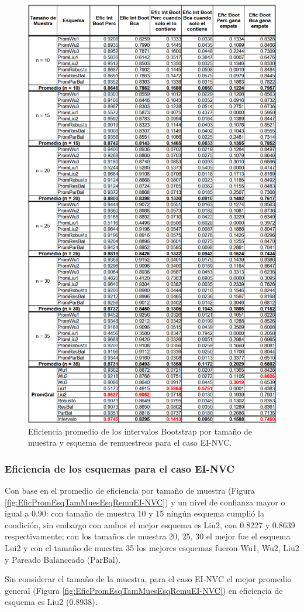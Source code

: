 \begin{figure}[ht] 
	\centering 
	\includegraphics[width=0.55\linewidth]{img/EI_NVC_Efic_Boots.png} 
	\caption{Eficiencia promedio de los intervalos Bootstrap por tamaño de muestra y esquema de remuestreos para el caso EI-NVC.} 
	\label{fig:EficPromIntBootsTamMuestEsqRemuEI-NVC}
\end{figure}
\FloatBarrier


\subsubsection{Eficiencia de los esquemas para el caso EI-NVC}
Con base en el promedio de eficiencia por tamaño de muestra (Figura \ref{fig:EficPromEsqTamMuesEsqRemuEI-NVC}) y un nivel de confianza mayor o igual a 0.90: con tamaño de muestra 10 y 15 ningún esquema cumplió la condición, sin embargo con ambos el mejor esquema es Liu2, con 0.8227 y 0.8639 respectivamente; con los tamaños de muestra 20, 25, 30 el mejor fue el esquema Lui2 y con el tamaño de muestra 35 los mejores esquemas fueron Wu1, Wu2, Liu2 y Pareado Balanceado (ParBal).
\vspace{.5cm}

Sin considerar el tamaño de la muestra, para el caso EI-NVC el mejor promedio general (Figura \ref{fig:EficPromEsqTamMuesEsqRemuEI-NVC}) en eficiencia de esquema es Liu2 (0.8938).


